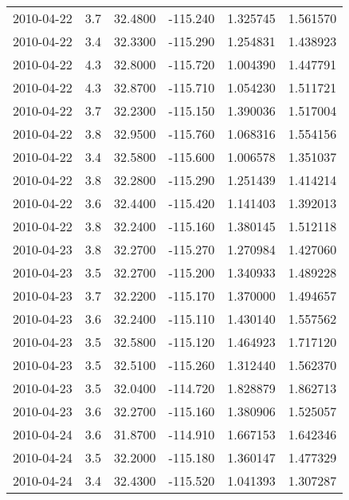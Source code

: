 \begin{tabular}{lrrrrr}
2010-04-22 &       3.7 &  32.4800 &  -115.240 &         1.325745 &         1.561570 \\
2010-04-22 &       3.4 &  32.3300 &  -115.290 &         1.254831 &         1.438923 \\
2010-04-22 &       4.3 &  32.8000 &  -115.720 &         1.004390 &         1.447791 \\
2010-04-22 &       4.3 &  32.8700 &  -115.710 &         1.054230 &         1.511721 \\
2010-04-22 &       3.7 &  32.2300 &  -115.150 &         1.390036 &         1.517004 \\
2010-04-22 &       3.8 &  32.9500 &  -115.760 &         1.068316 &         1.554156 \\
2010-04-22 &       3.4 &  32.5800 &  -115.600 &         1.006578 &         1.351037 \\
2010-04-22 &       3.8 &  32.2800 &  -115.290 &         1.251439 &         1.414214 \\
2010-04-22 &       3.6 &  32.4400 &  -115.420 &         1.141403 &         1.392013 \\
2010-04-22 &       3.8 &  32.2400 &  -115.160 &         1.380145 &         1.512118 \\
2010-04-23 &       3.8 &  32.2700 &  -115.270 &         1.270984 &         1.427060 \\
2010-04-23 &       3.5 &  32.2700 &  -115.200 &         1.340933 &         1.489228 \\
2010-04-23 &       3.7 &  32.2200 &  -115.170 &         1.370000 &         1.494657 \\
2010-04-23 &       3.6 &  32.2400 &  -115.110 &         1.430140 &         1.557562 \\
2010-04-23 &       3.5 &  32.5800 &  -115.120 &         1.464923 &         1.717120 \\
2010-04-23 &       3.5 &  32.5100 &  -115.260 &         1.312440 &         1.562370 \\
2010-04-23 &       3.5 &  32.0400 &  -114.720 &         1.828879 &         1.862713 \\
2010-04-23 &       3.6 &  32.2700 &  -115.160 &         1.380906 &         1.525057 \\
2010-04-24 &       3.6 &  31.8700 &  -114.910 &         1.667153 &         1.642346 \\
2010-04-24 &       3.5 &  32.2000 &  -115.180 &         1.360147 &         1.477329 \\
2010-04-24 &       3.4 &  32.4300 &  -115.520 &         1.041393 &         1.307287 \\

\end{tabular}
